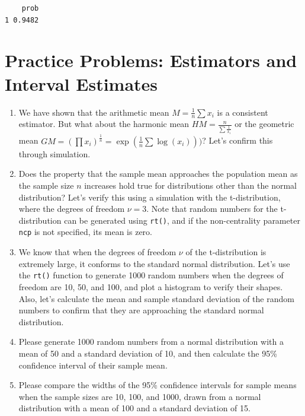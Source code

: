 \documentclass[
  a4paper,
]{book}
\begin{document}
\begin{verbatim}
    prob
1 0.9482
\end{verbatim}

\section{Practice Problems: Estimators and Interval
Estimates}\label{practice-problems-estimators-and-interval-estimates}

\begin{enumerate}
\def\labelenumi{\arabic{enumi}.}
\item
  We have shown that the arithmetic mean \(M = \frac{1}{n}\sum x_i\) is
  a consistent estimator. But what about the harmonic mean
  \(HM = \frac{n}{\sum \frac{1}{x_i}}\) or the geometric mean
  \(GM = (\prod x_i)^{\frac{1}{n}} = \exp(\frac{1}{n}\sum \log(x_i)))\)?
  Let's confirm this through simulation.
\item
  Does the property that the sample mean approaches the population mean
  as the sample size \(n\) increases hold true for distributions other
  than the normal distribution? Let's verify this using a simulation
  with the t-distribution, where the degrees of freedom \(\nu = 3\).
  Note that random numbers for the t-distribution can be generated using
  \texttt{rt()}, and if the non-centrality parameter \texttt{ncp} is not
  specified, its mean is zero.
\item
  We know that when the degrees of freedom \(\nu\) of the t-distribution
  is extremely large, it conforms to the standard normal distribution.
  Let's use the \texttt{rt()} function to generate 1000 random numbers
  when the degrees of freedom are 10, 50, and 100, and plot a histogram
  to verify their shapes. Also, let's calculate the mean and sample
  standard deviation of the random numbers to confirm that they are
  approaching the standard normal distribution.
\item
  Please generate 1000 random numbers from a normal distribution with a
  mean of 50 and a standard deviation of 10, and then calculate the 95\%
  confidence interval of their sample mean.
\item
  Please compare the widths of the 95\% confidence intervals for sample
  means when the sample sizes are 10, 100, and 1000, drawn from a normal
  distribution with a mean of 100 and a standard deviation of 15.
\end{enumerate}

\end{document}
